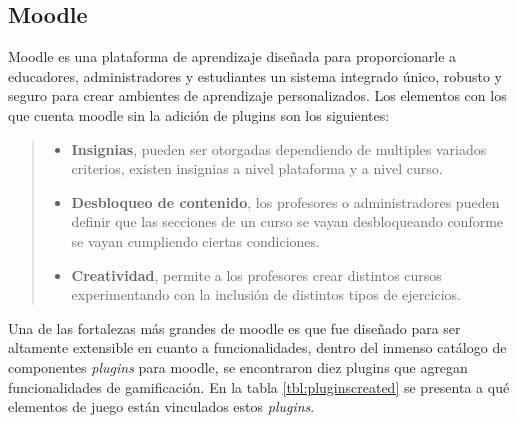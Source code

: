 \clearpage
\subsection*{Moodle}

 Moodle \cite{PagMoodle} es una plataforma de aprendizaje diseñada para proporcionarle a educadores,
 administradores y estudiantes un sistema integrado único, robusto y seguro para crear
 ambientes de aprendizaje personalizados. Los elementos con los que cuenta moodle sin
 la adición de plugins son los siguientes:

 \begin{quote}
 \begin{itemize}
    \item {\bf Insignias}, pueden ser otorgadas dependiendo de multiples variados
                criterios, existen insignias a nivel plataforma y a nivel curso.

    \item {\bf Desbloqueo de contenido}, los profesores o administradores pueden
                definir que las secciones de un curso se vayan desbloqueando
                conforme se vayan cumpliendo ciertas condiciones.

    \item {\bf Creatividad}, permite a los profesores crear distintos cursos
                experimentando con la inclusión de distintos tipos de ejercicios.
 \end{itemize}
 \end{quote}

 \noindent Una de las fortalezas más grandes de moodle es que fue diseñado para ser altamente
 extensible en cuanto a funcionalidades, dentro del inmenso catálogo de componentes {\it plugins}
 para moodle, se encontraron diez plugins que agregan funcionalidades de gamificación. En la tabla
 \ref{tbl:pluginscreated} se presenta a qué elementos de juego están vinculados estos {\it plugins}.


